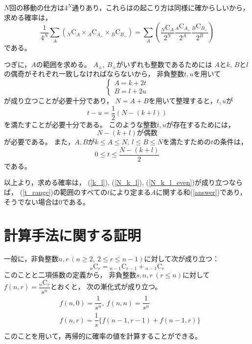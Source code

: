 \documentclass{article}
\begin{document}
$N$回の移動の仕方は$4^N$通りあり，これらはの起こり方は同様に確からしいから，求める確率は，
\begin{equation}
    \label{answer}
    \dfrac{1}{4^N}
    \sum_{A}
    \left(
    {}_N \mathrm{C}_{A}
    \times
    {}_A \mathrm{C}_{A_+}
    \times
    {}_B \mathrm{C}_{B_+}
    \right)
    =
    \sum_{A}
    \left(
    \dfrac{{}_N \mathrm{C}_{A}}{2^N}
    \dfrac{{}_A \mathrm{C}_{A_+}}{2^A}
    \dfrac{{}_B \mathrm{C}_{B_+}}{2^B}
    \right)
\end{equation}
である。

つぎに，$A$の範囲を求める。
$A_\pm,\ B_\pm$がいずれも整数であるためには
$A$と$k$, $B$と$l$の偶奇がそれぞれ一致しなければならないから，
非負整数$t, u$を用いて
\begin{equation*}
    \begin{cases}
        A = k + 2t \\
        B = l + 2u
    \end{cases}
\end{equation*}
が成り立つことが必要十分であり，
$N = A + B$を用いて整理すると，$t, u$が
\begin{equation*}
    t - u = \dfrac{1}{2} (N - (k + l))
\end{equation*}
を満たすことが必要十分である。
このような整数$t, u$が存在するためには，
\begin{equation}
    \label{N_k_l_even}
    N - (k + l) \mbox{が偶数}
\end{equation}
が必要である。
また，$A, B$が$k \leq A \leq N,\ l \leq B \leq N$を満たすための$t$の条件は，
\begin{equation}
    \label{t_range}
    0 \leq t \leq \dfrac{N - (k + l)}{2}
\end{equation}
である。

以上より，求める確率は，
(\ref{k_l}), (\ref{N_k_l}), (\ref{N_k_l_even})が成り立つならば，
(\ref{t_range})の範囲のすべての$t$により定まる$A$に関する和(\ref{answer})であり，
そうでない場合は0である。



\section{計算手法に関する証明}

一般に，非負整数$n, r\ (n \geq 2,\ 2 \leq r \leq n - 1)$に対して次が成り立つ：
\begin{equation*}
    {}_n \mathrm{C}_r = {}_{n-1} \mathrm{C}_{r-1} + {}_{n-1} \mathrm{C}_{r}
\end{equation*}
このことと二項係数の定義から，
非負整数$s, n, r\ (r \leq n)$に対して$f(n, r) = \dfrac{{}_n \mathrm{C}_r}{s^n}$とおくと，
次の漸化式が成り立つ。
\begin{eqnarray*}
    &f(n, 0) = \dfrac{1}{s^n},\ f(n, n) = \dfrac{1}{s^n} \\
    &f(n, r) = \dfrac{1}{s} \{f(n-1, r-1) + f(n-1, r)\} \\
\end{eqnarray*}
このことを用いて，再帰的に確率の値を計算することができる。
\end{document}
